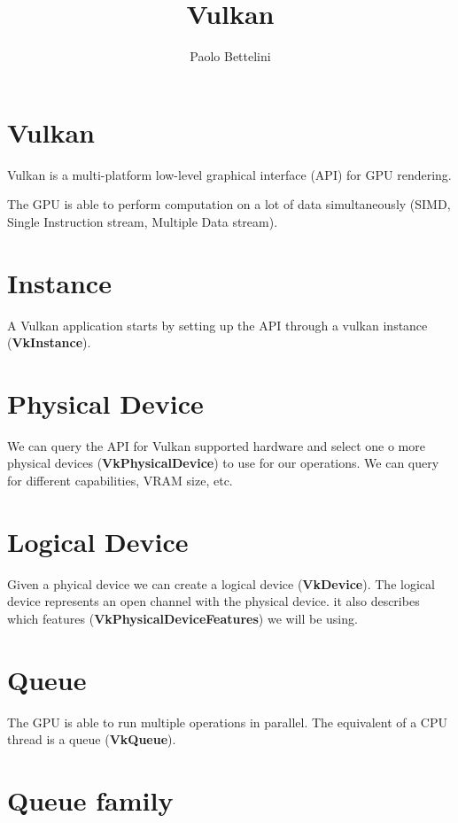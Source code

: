 \documentclass[a4paper]{article}
\title{Vulkan}
\author{Paolo Bettelini}
\date{}
\begin{document}
\maketitle
\tableofcontents
\pagebreak

\section{Vulkan}

Vulkan is a multi-platform low-level graphical interface (API)
for GPU rendering.

The GPU is able to perform computation on a lot of data simultaneously
(SIMD, Single Instruction stream, Multiple Data stream).

\section{Instance}

A Vulkan application starts by setting up the API through a vulkan instance
(\textbf{VkInstance}).

\section{Physical Device}

We can query the API for Vulkan supported hardware and select
one o more physical devices (\textbf{VkPhysicalDevice}) to use for our operations.
We can query for different capabilities, VRAM size, etc.

\section{Logical Device}

Given a phyical device we can create a logical device (\textbf{VkDevice}).
The logical device represents an open channel with the physical device.
it also describes which features (\textbf{VkPhysicalDeviceFeatures}) we will be using.

\section{Queue}

The GPU is able to run multiple operations in parallel.
The equivalent of a CPU thread is a queue (\textbf{VkQueue}).

\section{Queue family}
\end{document}
